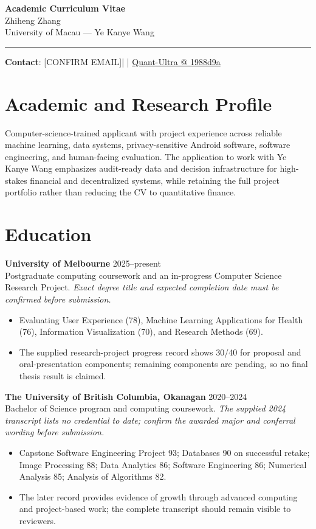 \documentclass[11pt]{article}
\makeatletter
\newcommand{\ApplicantName}{Zhiheng Zhang}
\newcommand{\ApplicantEmail}{[CONFIRM EMAIL]}
\newcommand{\ApplicantPhone}{[CONFIRM PHONE]}
\newcommand{\ApplicantGitHub}{\href{https://github.com/zhiheng-zhang-Mera/Quant-Ultra/tree/1988d9a8530da91a8158de864d098ea869098923}{Quant-Ultra @ 1988d9a}}
\makeatother
\begin{document}
\begin{center}
{\LARGE\bfseries Academic Curriculum Vitae}\\[0.25em]
{\large \ApplicantName}\\
University of Macau --- Ye Kanye Wang
\end{center}
\vspace{0.35em}\hrule\vspace{0.65em}

\textbf{Contact}: \ApplicantEmail\quad | \quad \ApplicantPhone\quad | \quad \ApplicantGitHub

\section*{Academic and Research Profile}
Computer-science-trained applicant with project experience across reliable machine learning, data systems, privacy-sensitive Android software, software engineering, and human-facing evaluation. The application to work with Ye Kanye Wang emphasizes audit-ready data and decision infrastructure for high-stakes financial and decentralized systems, while retaining the full project portfolio rather than reducing the CV to quantitative finance.

\section*{Education}
\textbf{University of Melbourne} \hfill 2025--present\\
Postgraduate computing coursework and an in-progress Computer Science Research Project. \textit{Exact degree title and expected completion date must be confirmed before submission.}
\begin{itemize}
\item Evaluating User Experience (78), Machine Learning Applications for Health (76), Information Visualization (70), and Research Methods (69).
\item The supplied research-project progress record shows 30/40 for proposal and oral-presentation components; remaining components are pending, so no final thesis result is claimed.
\end{itemize}

\textbf{The University of British Columbia, Okanagan} \hfill 2020--2024\\
Bachelor of Science program and computing coursework. \textit{The supplied 2024 transcript lists no credential to date; confirm the awarded major and conferral wording before submission.}
\begin{itemize}
\item Capstone Software Engineering Project 93; Databases 90 on successful retake; Image Processing 88; Data Analytics 86; Software Engineering 86; Numerical Analysis 85; Analysis of Algorithms 82.
\item The later record provides evidence of growth through advanced computing and project-based work; the complete transcript should remain visible to reviewers.
\end{itemize}
\end{document}
